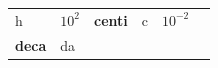 {\begin{tabular}[t]{|l|l|l|l|l|l|}
    
        h &
    
    
        
                \begin{math}{10}^{2}\end{math}
               &
    
    
        
                \textbf{centi}
               &
    
    
        c &
    
    
        
                \begin{math}{10}^{-2}\end{math}
     \tabularnewline\cline{1-1}\cline{2-2}\cline{3-3}\cline{4-4}\cline{5-5}\cline{6-6}
    
    
        
                \textbf{deca}
               &
    
    
        da &
    

\end{tabular}}
